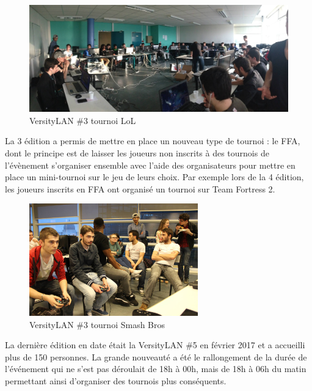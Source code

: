             \begin{figure}[ht]
                \centering
                \includegraphics[width=1\textwidth]{images/versity3.jpg}
                \caption{VersityLAN \#3 tournoi LoL}
            \end{figure}
            
            \newpage
            
            La 3 édition a permis de mettre en place un nouveau type de tournoi : le FFA, dont le principe est de laisser les joueurs non inscrits à des tournois de l'évènement s'organiser ensemble avec l'aide des organisateurs pour mettre en place un mini-tournoi sur le jeu de leurs choix. Par exemple lors de la 4 édition, les joueurs inscrits en FFA ont organisé un tournoi sur Team Fortress 2.
            
            \begin{figure}[ht]
                \centering
                \includegraphics[width=0.65\textwidth]{images/versity3smash.jpg}
                \caption{VersityLAN \#3 tournoi Smash Bros}
            \end{figure}
            
            La dernière édition en date était la VersityLAN \#5 en février 2017 et a accueilli plus de 150 personnes. La grande nouveauté a été le rallongement de la durée de l'événement qui ne s'est pas déroulait de 18h à 00h, mais de 18h à 06h du matin permettant ainsi d'organiser des tournois plus conséquents.
            
